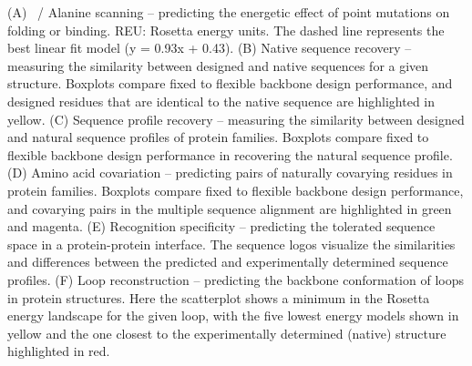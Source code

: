 (A) \ddg\ / Alanine scanning – predicting the energetic effect of point mutations on folding or binding. REU: Rosetta energy units. The dashed line represents the best linear fit model (y = 0.93x + 0.43). (B) Native sequence recovery – measuring the similarity between designed and native sequences for a given structure. Boxplots compare fixed to flexible backbone design performance, and designed residues that are identical to the native sequence are highlighted in yellow. (C) Sequence profile recovery – measuring the similarity between designed and natural sequence profiles of protein families. Boxplots compare fixed to flexible backbone design performance in recovering the natural sequence profile. (D) Amino acid covariation – predicting pairs of naturally covarying residues in protein families. Boxplots compare fixed to flexible backbone design performance, and covarying pairs in the multiple sequence alignment are highlighted in green and magenta. (E) Recognition specificity – predicting the tolerated sequence space in a protein-protein interface. The sequence logos \cite{crooks_weblogo:_2004} visualize the similarities and differences between the predicted and experimentally determined sequence profiles. (F) Loop reconstruction – predicting the backbone conformation of loops in protein structures. Here the scatterplot shows a minimum in the Rosetta energy landscape for the given loop, with the five lowest energy models shown in yellow and the one closest to the experimentally determined (native) structure highlighted in red.

